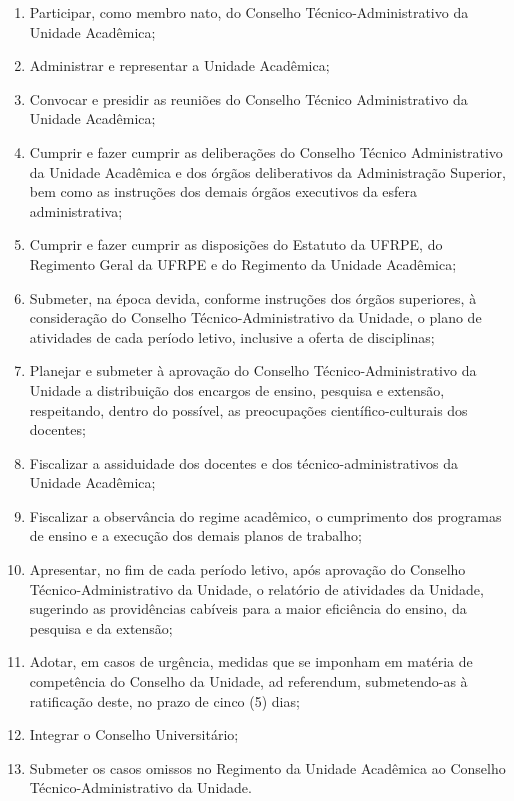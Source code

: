 \documentclass[
	12pt,				%
	openright,			%
  oneside,     %
	a4paper,			%
	chapter=TITLE,		%
	english,			%
	french,				%
	spanish,			%
	brazil				%
	]{abntex2}
\begin{document}
\begin{enumerate}
    \item Participar, como membro nato, do Conselho Técnico-Administrativo da Unidade Acadêmica;
    \item Administrar e representar a Unidade Acadêmica;
    \item Convocar e presidir as reuniões do Conselho Técnico Administrativo da Unidade Acadêmica;
    \item Cumprir e fazer cumprir as deliberações do Conselho Técnico Administrativo da Unidade Acadêmica e dos órgãos deliberativos da Administração Superior, 	bem como as instruções dos demais órgãos executivos da esfera administrativa;
    \item Cumprir e fazer cumprir as 	disposições do Estatuto da UFRPE, do Regimento Geral da UFRPE e do 	Regimento da Unidade Acadêmica;
    \item Submeter, na época devida, 	conforme instruções dos órgãos superiores, à consideração do Conselho Técnico-Administrativo da Unidade, o plano de atividades de cada período letivo, inclusive a oferta de disciplinas;
    \item Planejar e submeter à aprovação do Conselho Técnico-Administrativo da Unidade a distribuição dos encargos de ensino, pesquisa e extensão, respeitando, dentro do possível, as preocupações científico-culturais dos docentes;
    \item Fiscalizar a assiduidade dos docentes e dos técnico-administrativos da Unidade Acadêmica; 	
    \item Fiscalizar a observância do 	regime acadêmico, o cumprimento dos programas de ensino e a execução dos demais planos de trabalho;
    \item Apresentar, no fim de cada período letivo, após aprovação do Conselho Técnico-Administrativo da Unidade, o relatório de atividades da Unidade, sugerindo as providências cabíveis para a maior 	eficiência do ensino, da pesquisa e da extensão;
    \item Adotar, em casos de urgência, medidas que se imponham em matéria de competência do Conselho da 	Unidade, ad referendum, submetendo-as à ratificação deste, no prazo de cinco (5) dias;
    \item Integrar o Conselho Universitário;
    \item Submeter os casos omissos no Regimento da Unidade Acadêmica ao Conselho Técnico-Administrativo da Unidade.
\end{enumerate}
\end{document}
